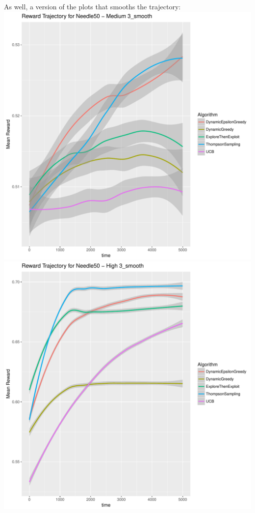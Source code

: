 \documentclass[11pt,letterpaper]{article}
\begin{document}
As well, a version of the plots that smooths the trajectory: \\
\includegraphics[scale=0.5]{"../results/Reward Trajectory for Needle50 - Medium 3_smooth"} \\
\includegraphics[scale=0.5]{"../results/Reward Trajectory for Needle50 - High 3_smooth"} \\
\end{document}
